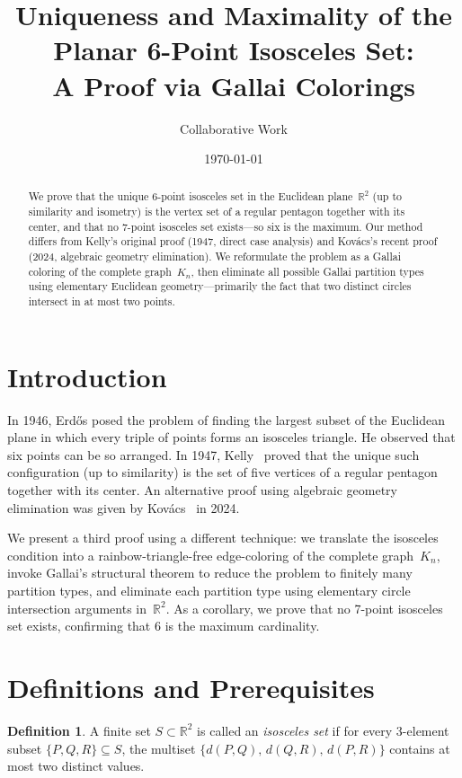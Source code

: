 \documentclass[12pt]{amsart}
\title{Uniqueness and Maximality of the Planar 6-Point Isosceles Set:\\A Proof via Gallai Colorings}
\author{Collaborative Work}
\date{\today}
\theoremstyle{definition}
\newtheorem{definition}[theorem]{Definition}
\begin{document}
\begin{abstract}
We prove that the unique 6-point isosceles set in the Euclidean plane~$\mathbb{R}^2$ (up to similarity and isometry) is the vertex set of a regular pentagon together with its center, and that no 7-point isosceles set exists---so six is the maximum. Our method differs from Kelly's original proof (1947, direct case analysis) and Kov\'acs's recent proof (2024, algebraic geometry elimination). We reformulate the problem as a Gallai coloring of the complete graph~$K_n$, then eliminate all possible Gallai partition types using elementary Euclidean geometry---primarily the fact that two distinct circles intersect in at most two points.
\end{abstract}

\maketitle

\section{Introduction}

In 1946, Erd\H{o}s posed the problem of finding the largest subset of the Euclidean plane in which every triple of points forms an isosceles triangle. He observed that six points can be so arranged. In 1947, Kelly~\cite{ErKe47} proved that the unique such configuration (up to similarity) is the set of five vertices of a regular pentagon together with its center. An alternative proof using algebraic geometry elimination was given by Kov\'acs~\cite{Ko24} in 2024.

We present a third proof using a different technique: we translate the isosceles condition into a rainbow-triangle-free edge-coloring of the complete graph~$K_n$, invoke Gallai's structural theorem to reduce the problem to finitely many partition types, and eliminate each partition type using elementary circle intersection arguments in~$\mathbb{R}^2$. As a corollary, we prove that no 7-point isosceles set exists, confirming that 6 is the maximum cardinality.

\section{Definitions and Prerequisites}

\begin{definition}
A finite set $S \subset \mathbb{R}^2$ is called an \emph{isosceles set} if for every 3-element subset $\{P, Q, R\} \subseteq S$, the multiset $\{d(P,Q),\, d(Q,R),\, d(P,R)\}$ contains at most two distinct values.
\end{definition}
\end{document}
